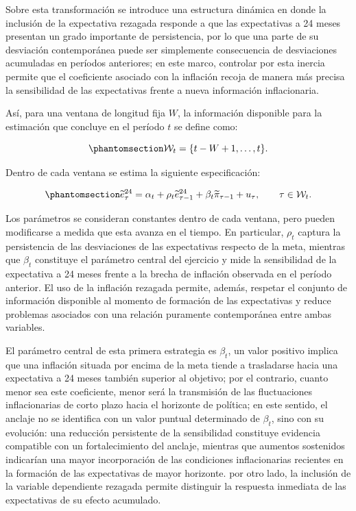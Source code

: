 \documentclass[
  10.5pt,
  letterpaper,
  twocolumn]{article}
\begin{document}
Sobre esta transformación se introduce una estructura dinámica en donde
la inclusión de la expectativa rezagada responde a que las expectativas
a 24 meses presentan un grado importante de persistencia, por lo que una
parte de su desviación contemporánea puede ser simplemente consecuencia
de desviaciones acumuladas en períodos anteriores; en este marco,
controlar por esta inercia permite que el coeficiente asociado con la
inflación recoja de manera más precisa la sensibilidad de las
expectativas frente a nueva información inflacionaria.

Así, para una ventana de longitud fija \(W\), la información disponible
para la estimación que concluye en el período \(t\) se define como:

\begin{equation}\phantomsection\label{eq-ventana-rolling}{
\mathcal{W}_t
=
\{t-W+1,\ldots,t\}.
}\end{equation}

Dentro de cada ventana se estima la siguiente especificación:

\begin{equation}\phantomsection\label{eq-modelo-rolling}{
\widetilde{e}^{24}_{\tau}
=
\alpha_t
+
\rho_t\widetilde{e}^{24}_{\tau-1}
+
\beta_t\widetilde{\pi}_{\tau-1}
+
u_{\tau},
\qquad
\tau\in\mathcal{W}_t.
}\end{equation}

Los parámetros se consideran constantes dentro de cada ventana, pero
pueden modificarse a medida que esta avanza en el tiempo. En particular,
\(\rho_t\) captura la persistencia de las desviaciones de las
expectativas respecto de la meta, mientras que \(\beta_t\) constituye el
parámetro central del ejercicio y mide la sensibilidad de la expectativa
a 24 meses frente a la brecha de inflación observada en el período
anterior. El uso de la inflación rezagada permite, además, respetar el
conjunto de información disponible al momento de formación de las
expectativas y reduce problemas asociados con una relación puramente
contemporánea entre ambas variables.

El parámetro central de esta primera estrategia es \(\beta_t\), un valor
positivo implica que una inflación situada por encima de la meta tiende
a trasladarse hacia una expectativa a 24 meses también superior al
objetivo; por el contrario, cuanto menor sea este coeficiente, menor
será la transmisión de las fluctuaciones inflacionarias de corto plazo
hacia el horizonte de política; en este sentido, el anclaje no se
identifica con un valor puntual determinado de \(\beta_t\), sino con su
evolución: una reducción persistente de la sensibilidad constituye
evidencia compatible con un fortalecimiento del anclaje, mientras que
aumentos sostenidos indicarían una mayor incorporación de las
condiciones inflacionarias recientes en la formación de las expectativas
de mayor horizonte. por otro lado, la inclusión de la variable
dependiente rezagada permite distinguir la respuesta inmediata de las
expectativas de su efecto acumulado.
\end{document}
